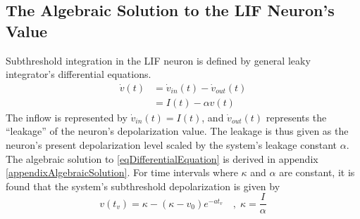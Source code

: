 
	\subsection{The Algebraic Solution to the LIF Neuron's Value}
	\label{ssecTheAlgebraicSolution}
		Subthreshold integration in the LIF neuron is defined by general leaky integrator's differential equations\cite{gerstnerKistler2002KAP04}.
		\begin{equation}
			\begin{split}
				\dot{v}(t)&= \dot{v}_{in}(t) - \dot{v}_{out}(t) \\
					&= I(t) - \alpha v(t)
			\end{split}
			\label{eqDifferentialEquation}
		\end{equation}
		The inflow is represented by $\dot{v}_{in}(t) = I(t)$, and $\dot{v}_{out}(t)$ represents the ``leakage'' of the neuron's depolarization value.
		The leakage is thus given as the neuron's present depolarization level scaled by the system's leakage constant $\alpha$.
		The algebraic solution to \ref{eqDifferentialEquation} is derived in appendix \ref{appendixAlgebraicSolution}.
		For time intervals where $\kappa$ and $\alpha$ are constant, it is found that the system's subthreshold depolarization is given by %
		\begin{equation}
			v(t_v) = \kappa - \left( \kappa - v_0 \right) e^{-at_v} 	\quad,\; \kappa = \frac{I}{\alpha} %
			\label{eqValueEquation}
		\end{equation}

